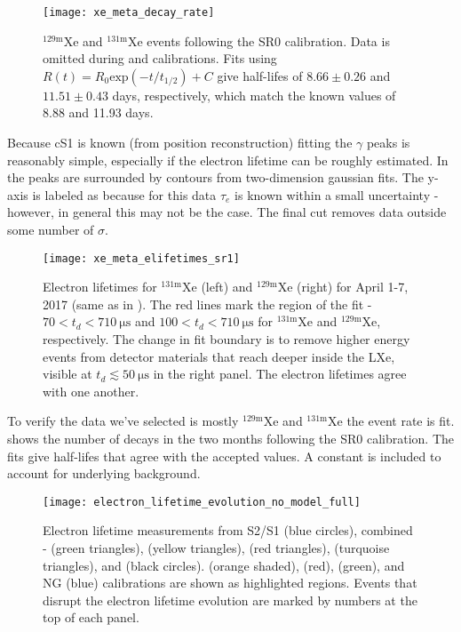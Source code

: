 \begin{figure}
\centering
\texttt{[image: xe\_meta\_decay\_rate]}
\caption{$\mathrm{^{129m}Xe}$ and $\mathrm{^{131m}Xe}$ events following the SR0 \ambe calibration.  Data is omitted during \metakr
and  calibrations.  Fits using $R(t) = R_0 \mathrm{exp}(-t/t_{1/2}) + C$ give half-lifes of $8.66 \pm 0.26$ and
$11.51 \pm 0.43$ days, respectively, which match the known values of 8.88 and 11.93 days.}
\label{fig:electron_lifetimes_measurement_gammas_decay_rate}
\end{figure}

Because cS1 is known (from position reconstruction) fitting the $\gamma$ peaks is reasonably simple, especially if the electron lifetime
can be roughly estimated.  In
 the peaks are surrounded by contours from two-dimension gaussian fits.  The
y-axis is labeled as \cstwob because for this data $\tau_e$ is known within a small uncertainty - however, in general this may not be
the case.  The final cut removes data outside some number of $\sigma$.

\begin{figure}
\centering
\texttt{[image: xe\_meta\_elifetimes\_sr1]}
\caption{Electron lifetimes for $\mathrm{^{131m}Xe}$ (left) and $\mathrm{^{129m}Xe}$ (right) for April 1-7, 2017 (same as in
).  The red lines mark the region of the fit - $70 < t_d < 710\ \mathrm{\mu s}$
and $100 < t_d < 710\ \mathrm{\mu s}$ for $\mathrm{^{131m}Xe}$ and $\mathrm{^{129m}Xe}$, respectively.  The change in fit boundary is to
remove higher energy events from detector materials that reach deeper inside the LXe, visible at $t_d \lesssim 50\ \mathrm{\mu s}$ in the
right panel.  The electron lifetimes agree with one another.}
\label{fig:electron_lifetimes_measurement_gammas_elifetime}
\end{figure}

To verify the data we've selected is mostly $\mathrm{^{129m}Xe}$ and $\mathrm{^{131m}Xe}$ the event rate is
fit.  shows the number of decays in the two months following the
SR0 \ambe calibration.  The fits give half-lifes that agree with the accepted values.  A constant is included to account for underlying
background.

\begin{figure}
\centering
\texttt{[image: electron\_lifetime\_evolution\_no\_model\_full]}
\caption{Electron lifetime measurements from S2/S1 (blue circles), combined - (green triangles), 
(yellow triangles),  (red triangles),  (turquoise triangles), and
\metakr (black circles).  \metakr (orange shaded),  (red), \ambe (green), and NG (blue) calibrations
are shown as highlighted regions.  Events that disrupt the electron lifetime evolution are marked by numbers at the top of each panel.}
\label{fig:electron_lifetimes_evolution_no_model}
\end{figure}

